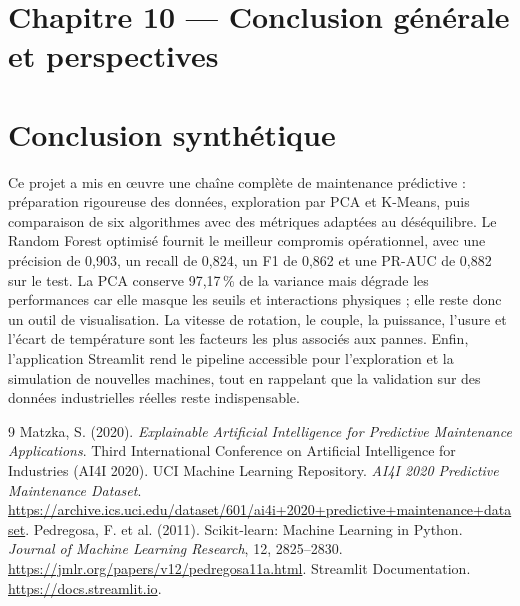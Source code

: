 \documentclass[12pt,a4paper]{article}
\begin{document}
\section{Chapitre 10 — Conclusion générale et perspectives}\label{sec:conclusion}
\section*{Conclusion synthétique}
Ce projet a mis en œuvre une chaîne complète de maintenance prédictive : préparation rigoureuse des données, exploration par PCA et K-Means, puis comparaison de six algorithmes avec des métriques adaptées au déséquilibre. Le Random Forest optimisé fournit le meilleur compromis opérationnel, avec une précision de 0,903, un recall de 0,824, un F1 de 0,862 et une PR-AUC de 0,882 sur le test. La PCA conserve 97,17\,\% de la variance mais dégrade les performances car elle masque les seuils et interactions physiques ; elle reste donc un outil de visualisation. La vitesse de rotation, le couple, la puissance, l'usure et l'écart de température sont les facteurs les plus associés aux pannes. Enfin, l'application Streamlit rend le pipeline accessible pour l'exploration et la simulation de nouvelles machines, tout en rappelant que la validation sur des données industrielles réelles reste indispensable.

\begin{thebibliography}{9}
 Matzka, S. (2020). \emph{Explainable Artificial Intelligence for Predictive Maintenance Applications}. Third International Conference on Artificial Intelligence for Industries (AI4I 2020).
 UCI Machine Learning Repository. \emph{AI4I 2020 Predictive Maintenance Dataset}. \url{https://archive.ics.uci.edu/dataset/601/ai4i+2020+predictive+maintenance+dataset}.
 Pedregosa, F. et al. (2011). Scikit-learn: Machine Learning in Python. \emph{Journal of Machine Learning Research}, 12, 2825--2830. \url{https://jmlr.org/papers/v12/pedregosa11a.html}.
 Streamlit Documentation. \url{https://docs.streamlit.io}.
\end{thebibliography}

\appendix
\end{document}
